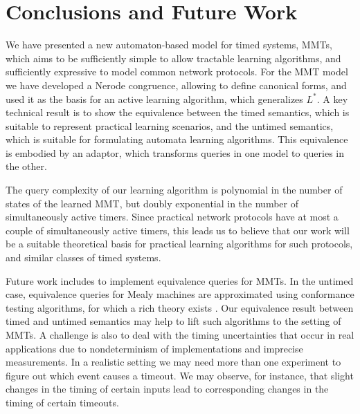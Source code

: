 
\section{Conclusions and Future Work}
\label{conclusions}

We have presented a new automaton-based model for timed systems, MMTs,
which aims to
be sufficiently simple to allow tractable learning algorithms, and sufficiently
expressive to model common network protocols. For the MMT model we have
developed a Nerode congruence, allowing to define canonical forms, and used it
as the basis for an active learning algorithm, which generalizes $L^*$.
A key technical result is to show the equivalence between the timed semantics,
which is suitable to represent practical learning scenarios, and the
untimed semantics, which is suitable for formulating automata learning
algorithms. This equivalence is embodied by an adaptor, which transforms
queries in one model to queries in the other.

The query complexity of our learning algorithm is polynomial in the number of
states of the learned MMT, but doubly exponential in the number of simultaneously
active timers. Since practical network protocols have at most a couple of
simultaneously active timers, this leads us to believe that our work will
be a suitable theoretical basis for practical learning algorithms for such
protocols, and similar classes of timed systems.

Future work includes to implement equivalence queries for MMTs.
In the untimed case, equivalence queries for Mealy machines are approximated using conformance testing algorithms,
for which a rich theory exists \cite{LeeY96}.
Our equivalence result between timed and untimed semantics may help to
lift such algorithms to the setting of MMTs.
A challenge is also to deal with the timing uncertainties that occur in real applications due to nondeterminism of
implementations and imprecise measurements. In a realistic
setting we may need more than one experiment to figure out which event causes a timeout. We may observe, for instance,
that slight changes in the timing of certain inputs lead to corresponding changes in the timing of certain timeouts.

